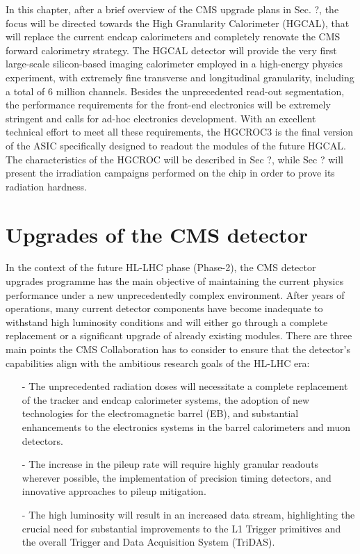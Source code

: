 In this chapter, after a brief overview of the CMS upgrade plans in Sec. {?}, the focus will be directed towards the High Granularity Calorimeter (HGCAL), that will replace the current endcap calorimeters and completely renovate the CMS forward calorimetry strategy. The HGCAL detector will provide the very first large-scale silicon-based imaging calorimeter employed in a high-energy physics experiment, with extremely fine transverse and longitudinal granularity, including a total of 6 million channels. Besides the unprecedented read-out segmentation, the performance requirements for the front-end electronics will be extremely stringent and calls for ad-hoc electronics development. With an excellent technical effort to meet all these requirements, the HGCROC3 is the final version of the ASIC specifically designed to readout the modules of the future HGCAL. 
The characteristics of the HGCROC will be described in Sec {?}, while Sec {?} will present the irradiation campaigns performed on the chip in order to prove its radiation hardness. 

\section{Upgrades of the CMS detector}

In the context of the future HL-LHC phase (Phase-2), the CMS detector upgrades programme has the main objective of maintaining the current physics performance under a new unprecedentedly complex environment. 
After years of operations, many current detector components have become inadequate to withstand high luminosity conditions and will either go through a complete replacement or a significant upgrade of already existing modules. There are three main points the CMS Collaboration has to consider to ensure that the detector's capabilities align with the ambitious research goals of the HL-LHC era:
\begin{itemize}
    \item [-] The unprecedented radiation doses will necessitate a complete replacement of the tracker and endcap calorimeter systems, the adoption of new technologies for the electromagnetic barrel (EB), and substantial enhancements to the electronics systems in the barrel calorimeters and muon detectors.
    \item [-] The increase in the pileup rate will require highly granular readouts wherever possible, the implementation of precision timing detectors, and innovative approaches to pileup mitigation.
    \item [-] The high luminosity will result in an increased data stream, highlighting the crucial need for substantial improvements to the L1 Trigger primitives and the overall Trigger and Data Acquisition System (TriDAS).
\end{itemize}

